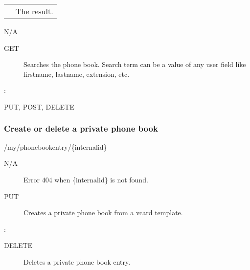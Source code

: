 \documentclass[letterpaper,10pt,english]{sphinxmanual}
\begin{document}
\begin{savenotes}\sphinxattablestart
\centering
\begin{tabulary}{\linewidth}[t]{|T|T|}
\hline

&
\\
\hline
{}
&
The result.
\\
\hline
\end{tabulary}
\par
\sphinxattableend\end{savenotes}

 N/A
\begin{description}
\item[{ GET}] \leavevmode
Searches the phone book. Search term can be a value of any user field like firstname, lastname, extension, etc.

\end{description}

:

\begin{sphinxVerbatim}[commandchars=\\\{\}]
\end{sphinxVerbatim}

 PUT, POST, DELETE


\subsubsection{Create or delete a private phone book}
\label{\detokenize{restapi:create-or-delete-a-private-phone-book}}
 /my/phonebookentry/\{internalid\}

 N/A
\begin{description}
\item[{}] \leavevmode
Error 404 when \{internalid\} is not found.

\item[{ PUT}] \leavevmode
Creates a private phone book from a vcard template.

\end{description}

:

\begin{sphinxVerbatim}[commandchars=\\\{\}]
\end{sphinxVerbatim}
\begin{description}
\item[{ DELETE}] \leavevmode
Deletes a private phone book entry.

\end{description}
\end{document}
